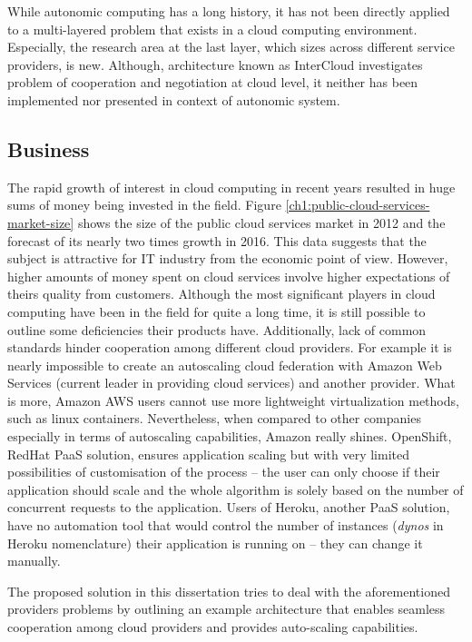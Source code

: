 While autonomic computing has a long history, it has not been directly applied to a multi-layered problem that exists in a cloud computing environment. Especially, the research area at the last layer, which sizes across different service providers, is new. Although, architecture known as InterCloud investigates problem of cooperation and negotiation at cloud level, it neither has been implemented nor presented in context of autonomic system.

\subsection{Business}
The rapid growth of interest in cloud computing in recent years resulted in huge sums of money being invested in the field. Figure \ref{ch1:public-cloud-services-market-size} shows the size of the public cloud services market in 2012 and the forecast of its nearly two times growth in 2016. This data suggests that the subject is attractive for IT industry from the economic point of view. However, higher amounts of money spent on cloud services involve higher expectations of theirs quality from customers. Although the most significant players in cloud computing have been in the field for quite a long time, it is still possible to outline some deficiencies their products have. Additionally, lack of common standards hinder cooperation among different cloud providers. For example it is nearly impossible to create an autoscaling cloud federation with Amazon Web Services (current leader in providing cloud services\cite{GartnerMagicQuadrantSep2013}) and another provider. What is more, Amazon AWS users cannot use more lightweight virtualization methods, such as linux containers. Nevertheless, when compared to other companies especially in terms of autoscaling capabilities, Amazon really shines. OpenShift, RedHat PaaS solution, ensures application scaling but with very limited possibilities of customisation of the process -- the user can only choose if their application should scale and the whole algorithm is solely based on the number of concurrent requests to the application. Users of Heroku, another PaaS solution, have no automation tool that would control the number of instances (\emph{dynos} in Heroku nomenclature) their application is running on -- they can change it manually.

The proposed solution in this dissertation tries to deal with the aforementioned providers problems by outlining an example architecture that enables seamless cooperation among cloud providers and provides auto-scaling capabilities.

